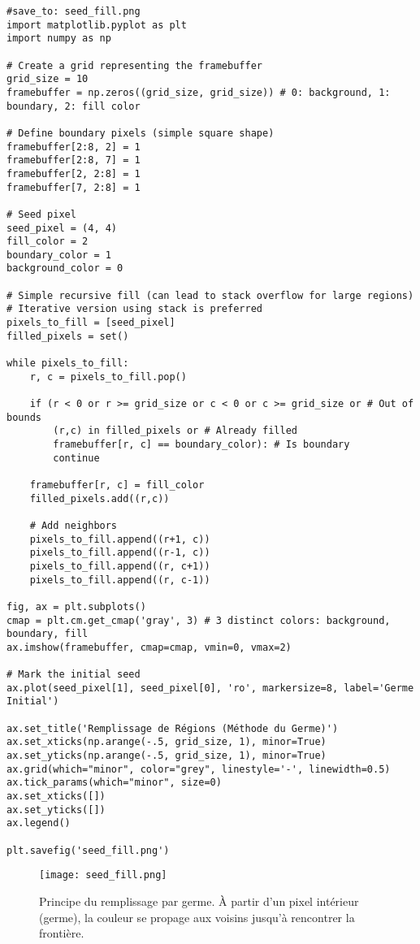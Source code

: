 \documentclass{article}
\begin{document}
\begin{verbatim}
#save_to: seed_fill.png
import matplotlib.pyplot as plt
import numpy as np

# Create a grid representing the framebuffer
grid_size = 10
framebuffer = np.zeros((grid_size, grid_size)) # 0: background, 1: boundary, 2: fill color

# Define boundary pixels (simple square shape)
framebuffer[2:8, 2] = 1
framebuffer[2:8, 7] = 1
framebuffer[2, 2:8] = 1
framebuffer[7, 2:8] = 1

# Seed pixel
seed_pixel = (4, 4)
fill_color = 2
boundary_color = 1
background_color = 0

# Simple recursive fill (can lead to stack overflow for large regions)
# Iterative version using stack is preferred
pixels_to_fill = [seed_pixel]
filled_pixels = set()

while pixels_to_fill:
    r, c = pixels_to_fill.pop()

    if (r < 0 or r >= grid_size or c < 0 or c >= grid_size or # Out of bounds
        (r,c) in filled_pixels or # Already filled
        framebuffer[r, c] == boundary_color): # Is boundary
        continue

    framebuffer[r, c] = fill_color
    filled_pixels.add((r,c))

    # Add neighbors
    pixels_to_fill.append((r+1, c))
    pixels_to_fill.append((r-1, c))
    pixels_to_fill.append((r, c+1))
    pixels_to_fill.append((r, c-1))

fig, ax = plt.subplots()
cmap = plt.cm.get_cmap('gray', 3) # 3 distinct colors: background, boundary, fill
ax.imshow(framebuffer, cmap=cmap, vmin=0, vmax=2)

# Mark the initial seed
ax.plot(seed_pixel[1], seed_pixel[0], 'ro', markersize=8, label='Germe Initial')

ax.set_title('Remplissage de Régions (Méthode du Germe)')
ax.set_xticks(np.arange(-.5, grid_size, 1), minor=True)
ax.set_yticks(np.arange(-.5, grid_size, 1), minor=True)
ax.grid(which="minor", color="grey", linestyle='-', linewidth=0.5)
ax.tick_params(which="minor", size=0)
ax.set_xticks([])
ax.set_yticks([])
ax.legend()

plt.savefig('seed_fill.png')
\end{verbatim}

\begin{figure}[H]
\centering
\texttt{[image: seed\_fill.png]}
\caption{Principe du remplissage par germe. À partir d'un pixel intérieur (germe), la couleur se propage aux voisins jusqu'à rencontrer la frontière.}
\label{fig:seed_fill}
\end{figure}
\end{document}
